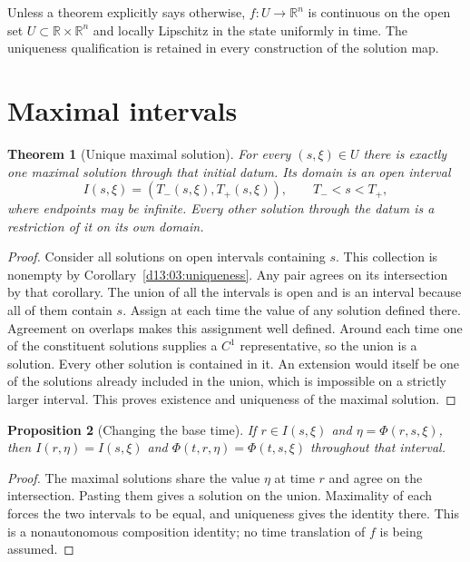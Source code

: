 \documentclass[11pt,oneside]{book}
\newtheorem{theorem}{Theorem}[chapter]
\newtheorem{proposition}[theorem]{Proposition}
\theoremstyle{definition}
\theoremstyle{remark}\newtheorem{remark}[theorem]{Remark}
\newcommand{\R}{\mathbb R}\newcommand{\C}{\mathbb C}
\begin{document}
Unless a theorem explicitly says otherwise, $f:U\to\R^n$ is continuous
on the open set $U\subset\R\times\R^n$ and locally Lipschitz in the
state uniformly in time. The uniqueness qualification is retained in
every construction of the solution map.

\section{Maximal intervals}
\begin{theorem}[Unique maximal solution]\label{d13:04:maximal}
For every $(s,\xi)\in U$ there is exactly one maximal solution through
that initial datum. Its domain is an open interval
\[
 I(s,\xi)=(T_-(s,\xi),T_+(s,\xi)),\qquad T_-<s<T_+,
\]
where endpoints may be infinite. Every other solution through the datum
is a restriction of it on its own domain.
\end{theorem}
\begin{proof}
Consider all solutions on open intervals containing $s$. This collection
is nonempty by Corollary~\ref{d13:03:uniqueness}. Any pair agrees on its
intersection by that corollary. The union of all the intervals is open
and is an interval because all of them contain $s$. Assign at each time
the value of any solution defined there. Agreement on overlaps makes
this assignment well defined. Around each time one of the constituent
solutions supplies a $C^1$ representative, so the union is a solution.
Every other solution is contained in it. An extension would itself be
one of the solutions already included in the union, which is impossible
on a strictly larger interval. This proves existence and uniqueness of
the maximal solution.
\end{proof}

\begin{proposition}[Changing the base time]\label{d13:04:rebase}
If $r\in I(s,\xi)$ and $\eta=\Phi(r,s,\xi)$, then
$I(r,\eta)=I(s,\xi)$ and
$\Phi(t,r,\eta)=\Phi(t,s,\xi)$ throughout that interval.
\end{proposition}
\begin{proof}
The maximal solutions share the value $\eta$ at time $r$ and agree on
the intersection. Pasting them gives a solution on the union. Maximality
of each forces the two intervals to be equal, and uniqueness gives the
identity there. This is a nonautonomous composition identity; no time
translation of $f$ is being assumed.
\end{proof}
\end{document}
